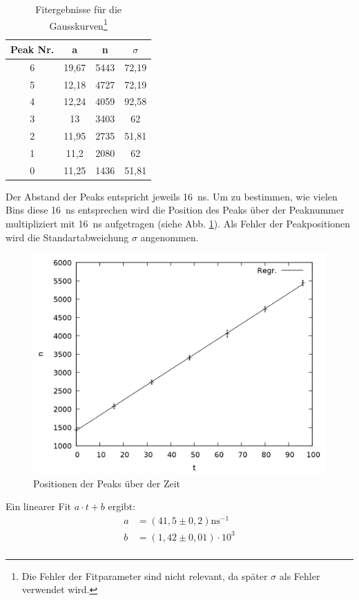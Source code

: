 \begin{table}
\centering
\caption{Fitergebnisse für die Gausskurven\footnote{Die Fehler der Fitparameter sind nicht relevant, da später $\sigma$ als Fehler verwendet wird.}}
\begin{tabular}{cccc}
\toprule
Peak Nr. & a & n & $\sigma$\\
\midrule
6&	19,67&	5443&	72,19\\
5&	12,18&	4727&	72,19\\
4&	12,24&	4059&	92,58\\
3&	13&	3403&	62\\
2&	11,95&	2735&	51,81\\
1&	11,2&	2080&	62\\
0&	11,25&	1436&	51,81\\
\bottomrule
\end{tabular}
\end{table}

Der Abstand der Peaks entspricht jeweils \SI{16}{\nano\second}. Um zu bestimmen, wie vielen Bins diese \SI{16}{\nano\second} entsprechen wird die Position des Peaks über der Peaknummer multipliziert mit \SI{16}{\nano\second} aufgetragen (siehe Abb. \ref{fig:prompt_time}). Als Fehler der Peakpositionen wird die Standartabweichung $\sigma$ angenommen.  

\begin{figure}
\centering
\includegraphics[width=0.7\linewidth]{data/prompt_time.png}
\caption{Positionen der Peaks über der Zeit}
\label{fig:prompt_time}
\end{figure}

Ein linearer Fit $a\cdot t + b$ ergibt:\\
\begin{align*}
a &= (41,5 \pm 0,2) \si{\nano\second}^{-1}\\
b &= (1,42 \pm 0,01) \cdot 10^{3}\\
\end{align*}

